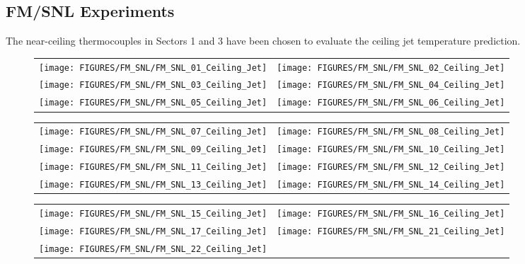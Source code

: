 \clearpage

\subsection{FM/SNL Experiments}

The near-ceiling thermocouples in Sectors 1 and 3 have been chosen to evaluate the ceiling jet temperature prediction. 

\begin{figure}[h!]
\begin{tabular*}{\textwidth}{l@{\extracolsep{\fill}}r}
\texttt{[image: FIGURES/FM\_SNL/FM\_SNL\_01\_Ceiling\_Jet]} &
\texttt{[image: FIGURES/FM\_SNL/FM\_SNL\_02\_Ceiling\_Jet]} \\
\texttt{[image: FIGURES/FM\_SNL/FM\_SNL\_03\_Ceiling\_Jet]} &
\texttt{[image: FIGURES/FM\_SNL/FM\_SNL\_04\_Ceiling\_Jet]} \\
\texttt{[image: FIGURES/FM\_SNL/FM\_SNL\_05\_Ceiling\_Jet]} &
\texttt{[image: FIGURES/FM\_SNL/FM\_SNL\_06\_Ceiling\_Jet]} \\
\end{tabular*}
\label{FM_SNL_Ceiling_Jet_1}
\end{figure}

\begin{figure}[h!]
\begin{tabular*}{\textwidth}{l@{\extracolsep{\fill}}r}
\texttt{[image: FIGURES/FM\_SNL/FM\_SNL\_07\_Ceiling\_Jet]} &
\texttt{[image: FIGURES/FM\_SNL/FM\_SNL\_08\_Ceiling\_Jet]} \\
\texttt{[image: FIGURES/FM\_SNL/FM\_SNL\_09\_Ceiling\_Jet]} &
\texttt{[image: FIGURES/FM\_SNL/FM\_SNL\_10\_Ceiling\_Jet]} \\
\texttt{[image: FIGURES/FM\_SNL/FM\_SNL\_11\_Ceiling\_Jet]} &
\texttt{[image: FIGURES/FM\_SNL/FM\_SNL\_12\_Ceiling\_Jet]} \\
\texttt{[image: FIGURES/FM\_SNL/FM\_SNL\_13\_Ceiling\_Jet]} &
\texttt{[image: FIGURES/FM\_SNL/FM\_SNL\_14\_Ceiling\_Jet]} \\
\end{tabular*}
\label{FM_SNL_Ceiling_Jet_2}
\end{figure}

\begin{figure}[h!]
\begin{tabular*}{\textwidth}{l@{\extracolsep{\fill}}r}
\texttt{[image: FIGURES/FM\_SNL/FM\_SNL\_15\_Ceiling\_Jet]} &
\texttt{[image: FIGURES/FM\_SNL/FM\_SNL\_16\_Ceiling\_Jet]} \\
\texttt{[image: FIGURES/FM\_SNL/FM\_SNL\_17\_Ceiling\_Jet]} &
\texttt{[image: FIGURES/FM\_SNL/FM\_SNL\_21\_Ceiling\_Jet]} \\
\texttt{[image: FIGURES/FM\_SNL/FM\_SNL\_22\_Ceiling\_Jet]} \\
\end{tabular*}
\label{FM_SNL_Ceiling_Jet_3}
\end{figure}


